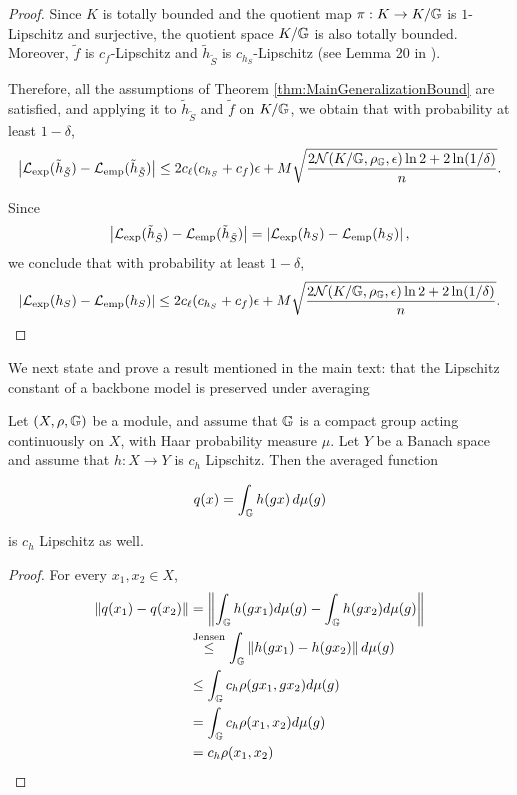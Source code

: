 \documentclass{article}
\begin{document}
\begin{proof}
Since $K$ is totally bounded and the quotient map
$\pi:K\to K/\mathbb{G}$ is $1$-Lipschitz and surjective, the quotient space
$K/\mathbb{G}$ is also totally bounded. Moreover, $\tilde{f}$ is
$c_f$-Lipschitz and $\tilde{h}_{\tilde S}$ is
$c_{h_S}$-Lipschitz (see Lemma 20 in
\cite{siegel2026quantitativeapproximationratesgroup}).

Therefore, all the assumptions of Theorem
\ref{thm:MainGeneralizationBound} are satisfied, and applying it to
$\tilde{h}_{\tilde S}$ and $\tilde{f}$ on $K/\mathbb{G}$, we obtain that with
probability at least $1-\delta$,
\begin{align*}
\left|
\mathcal{L}_{\mathrm{exp}}(\tilde{h}_{\tilde S})
-
\mathcal{L}_{\mathrm{emp}}(\tilde{h}_{\tilde S})
\right|
\leq
2c_\ell(c_{h_S}+c_f)\epsilon
+
M\sqrt{
\frac{
2\mathcal{N}(K/\mathbb{G},\rho_{\mathbb{G}},\epsilon)\ln 2
+
2\ln(1/\delta)
}{n}
}.
\end{align*}

Since
\[
\left|
\mathcal{L}_{\mathrm{exp}}(\tilde{h}_{\tilde S})
-
\mathcal{L}_{\mathrm{emp}}(\tilde{h}_{\tilde S})
\right|
=
\left|
\mathcal{L}_{\mathrm{exp}}(h_S)
-
\mathcal{L}_{\mathrm{emp}}(h_S)
\right|,
\]
we conclude that with probability at least $1-\delta$,
\begin{align*}
\left|
\mathcal{L}_{\mathrm{exp}}(h_S)
-
\mathcal{L}_{\mathrm{emp}}(h_S)
\right|
\leq
2c_\ell(c_{h_S}+c_f)\epsilon
+
M\sqrt{
\frac{
2\mathcal{N}(K/\mathbb{G},\rho_{\mathbb{G}},\epsilon)\ln 2
+
2\ln(1/\delta)
}{n}
}.
\end{align*}


\end{proof}


We next state and prove a result mentioned in the main text: that the Lipschitz constant of a backbone model is preserved under averaging 
\begin{proposition}
\label{prop:Lavg}
Let $(X,\rho,\mathbb{G})$ be a module, and assume that $\mathbb{G}$ is a compact group acting continuously on $X$, with Haar probability measure $\mu$. Let $Y$ be a Banach space and assume that $h:X\to Y$ is $c_h$ Lipschitz. Then the averaged function

$$
q(x)=\int_{\mathbb{G}} h(gx)\,d\mu(g)
$$

is $c_h$ Lipschitz as well.
\end{proposition}

\begin{proof}
For every $x_1,x_2\in X$,
\begin{align*}
\|q(x_1)-q(x_2)\|&=\left\|\int_{\mathbb{G}} h(gx_1)d\mu(g)-\int_{\mathbb{G}} h(gx_2)d\mu(g) \right\|\\
&\stackrel{\text{Jensen}}{\leq} \int_{\mathbb{G}} \left\|h(gx_1)-h(gx_2) \right\|d\mu(g)\\
&\leq \int_{\mathbb{G}} c_h \rho(gx_1,gx_2) d\mu(g)\\
&=\int_{\mathbb{G}} c_h \rho(x_1,x_2) d\mu(g)\\
&=c_h\rho(x_1,x_2)
\end{align*}
\end{proof}
\end{document}

